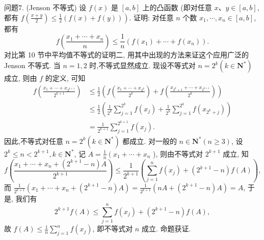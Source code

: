 问题7. (Jenson 不等式) 设 $f(x)$ 是 $[a, b]$ 上的凸函数 (即对任意 $x 、 y \in[a, b]$, 都有 $\left.f\left(\frac{x+y}{2}\right) \leqslant \frac{1}{2}(f(x)+f(y))\right)$.
证明: 对任意 $n$ 个数 $x_1, \cdots, x_n \in[a, b]$,都有
$$
f\left(\frac{x_1+\cdots+x_n}{n}\right) \leqslant \frac{1}{n}\left(f\left(x_1\right)+\cdots+f\left(x_n\right)\right) .
$$
对比第 10 节中平均值不等式的证明二, 用其中出现的方法来证这个应用广泛的 Jenson 不等式.
当 $n=1,2$ 时,不等式显然成立.
现设不等式对 $n=2^k\left(k \in \mathbf{N}^*\right)$ 成立, 则由 $f$ 的定义, 可知
$$
\begin{aligned}
f\left(\frac{x_1+\cdots+x_{2^{k+1}}}{2^{k+1}}\right) & \leqslant \frac{1}{2}\left(f\left(\frac{x_1+\cdots+x_{2^k}}{2^k}\right)+f\left(\frac{x_{2^k+1}+\cdots+x_{2^{k+1}}}{2^k}\right)\right) \\
& \leqslant \frac{1}{2}\left(\frac{1}{2^k} \sum_{j=1}^{2^k} f\left(x_j\right)+\frac{1}{2^k} \sum_{j=1}^{2^k} f\left(x_{2^k+j}\right)\right) \\
& =\frac{1}{2^{k+1}} \sum_{j=1}^{2^{k+1}} f\left(x_j\right) .
\end{aligned}
$$
因此,不等式对任意 $n=2^k\left(k \in \mathbf{N}^*\right)$ 都成立.
对一般的 $n \in \mathbf{N}^*(n \geqslant 3)$, 设 $2^k \leqslant n<2^{k+1}, k \in \mathbf{N}^*$, 记 $A=\frac{1}{n}\left(x_1+\cdots+\right. x_n$ ), 则由不等式对 $2^{k+1}$ 成立, 知
$$
f\left(\frac{x_1+\cdots+x_n+\left(2^{k+1}-n\right) A}{2^{k+1}}\right) \leqslant \frac{1}{2^{k+1}}\left(\sum_{j=1}^n f\left(x_j\right)+\left(2^{k+1}-n\right) f(A)\right),
$$
而 $\frac{1}{2^{k+1}}\left(x_1+\cdots+x_n+\left(2^{k+1}-n\right) A\right)=\frac{1}{2^{k+1}}\left(n A+\left(2^{k+1}-n\right) A\right)=A$, 于是, 我们有
$$
2^{k+1} f(A) \leqslant \sum_{j=1}^n f\left(x_j\right)+\left(2^{k+1}-n\right) f(A),
$$
故 $f(A) \leqslant \frac{1}{n} \sum_{j=1}^n f\left(x_j\right)$, 即不等式对 $n$ 成立.
命题获证.



